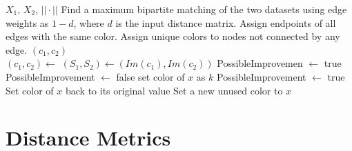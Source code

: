 \documentclass[11pt]{article}
\begin{document}
\begin{algorithmic}
 {$X_1$, $X_2$, $||\cdot ||$}
	\State Find a maximum bipartite matching of the two datasets using edge weights as $1 - d$, where $d$ is the input distance matrix.
	\State Assign endpoints of all edges with the same color.
	\State Assign unique colors to nodes not connected by any edge.
	\State \Return $(c_1, c_2)$
\EndFunction
\\
	\State $(c_1,c_2) \gets$ 
	\State $(S_1, S_2) \gets (Im(c_1), Im(c_2))$
	\State PossibleImprovemen $\gets$ true
		\State PossibleImprovement $\gets$ false
					\State set color of $x$ as $k$
						\State PossibleImprovement $\gets$ true
					\Else
						\State Set color of $x$ back to its original value
					\EndIf
				\EndIf
			\EndFor
				\State Set a new unused color to $x$
			\EndIf
		\EndFor
	\EndWhile
	\State {}
\EndFunction
\end{algorithmic}

\section{Distance Metrics}
\end{document}

